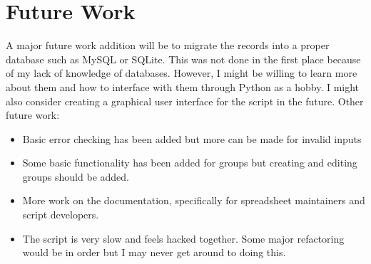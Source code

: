 \section{Future Work}
A major future work addition will be to migrate the records into a proper database such as MySQL or SQLite. This was not done in the first place because of my lack of knowledge of databases. However, I might be willing to learn more about them and how to interface with them through Python as a hobby. I might also consider creating a graphical user interface for the script in the future. Other future work:
\begin{itemize}
\item Basic error checking has been added but more can be made for invalid inputs
\item Some basic functionality has been added for groups but creating and editing groups should be added.
\item More work on the documentation, specifically for spreadsheet maintainers and script developers.
\item The script is very slow and feels hacked together. Some major refactoring would be in order but I may never get around to doing this.
\end{itemize}

